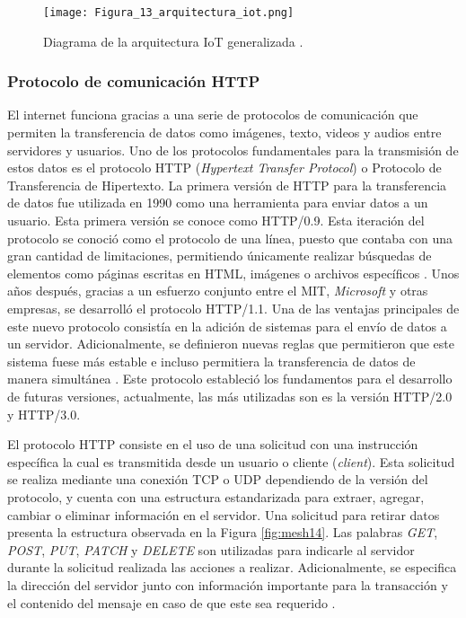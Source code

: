 \begin{figure}[H]
	\centering
	\texttt{[image: Figura\_13\_arquitectura\_iot.png]}
	\caption{Diagrama de la arquitectura IoT generalizada \cite{grizhnevich_iot_2018}.}
	\label{fig:mesh13}
\end{figure}

\subsubsection*{Protocolo de comunicación HTTP}
El internet funciona gracias a una serie de protocolos de comunicación que permiten la transferencia de datos como imágenes, texto, videos y audios entre servidores y usuarios. Uno de los protocolos fundamentales para la transmisión de estos datos es el protocolo HTTP (\textit{Hypertext Transfer Protocol}) o Protocolo de Transferencia de Hipertexto. La primera versión de HTTP para la transferencia de datos fue utilizada en 1990 como una herramienta para enviar datos a un usuario. Esta primera versión se conoce como HTTP/0.9. Esta iteración del protocolo se conoció como el protocolo de una línea, puesto que contaba con una gran cantidad de limitaciones, permitiendo únicamente realizar búsquedas de elementos como páginas escritas en HTML, imágenes o archivos específicos \cite{Evolution_http_Mozilla_2024}. Unos años después, gracias a un esfuerzo conjunto entre el MIT, \textit{Microsoft} y otras empresas, se desarrolló el protocolo HTTP/1.1. Una de las ventajas principales de este nuevo protocolo consistía en la adición de sistemas para el envío de datos a un servidor. Adicionalmente, se definieron nuevas reglas que permitieron que este sistema fuese más estable e incluso permitiera la transferencia de datos de manera simultánea \cite{fielding_hypertext_1999}. Este protocolo estableció los fundamentos para el desarrollo de futuras versiones, actualmente, las más utilizadas son  es la versión HTTP/2.0 y HTTP/3.0.

El protocolo HTTP consiste en el uso de una solicitud con una instrucción específica la cual es transmitida desde un usuario o cliente (\textit{client}). Esta solicitud se realiza mediante una conexión TCP o UDP dependiendo de la versión del protocolo, y cuenta con una estructura estandarizada para extraer, agregar, cambiar o eliminar información en el servidor. Una solicitud para retirar datos presenta la estructura observada en la Figura \ref{fig:mesh14}. Las palabras \textit{GET}, \textit{POST}, \textit{PUT}, \textit{PATCH} y \textit{DELETE} son utilizadas para indicarle al servidor durante la solicitud realizada las acciones a realizar. Adicionalmente, se especifica la dirección del servidor junto con información importante para la transacción y el contenido del mensaje en caso de que este sea requerido \cite{overview_http_mozilla_2024}.

